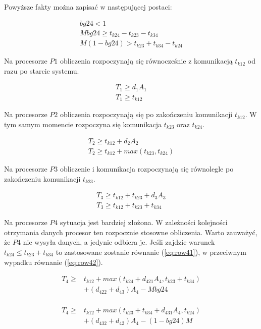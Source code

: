 Powyższe fakty można zapisać w następującej postaci:

\begin{equation}
\begin{array}{l}
bg24 < 1 \\
Mbg24 \geq t_{k24} - t_{k23} - t_{k34} \\
M(1 - bg24) > t_{k23} + t_{k34} - t_{k24}
\end{array}
\end{equation}

Na procesorze $P1$ obliczenia rozpoczynają się równocześnie z komunikacją $t_{k12}$ od razu po starcie systemu.

\begin{equation}
\begin{array}{l}
T_{1} \geq d_{1}A_{1} \\
T_{1} \geq t_{k12}
\end{array}
\end{equation}

Na procesorze $P2$ obliczenia rozpoczynają się po zakończeniu komunikacji $t_{k12}$.
W tym samym momencie rozpoczyna się komunikacja $t_{k23}$ oraz $t_{k24}$.

\begin{equation}
\begin{array}{l}
T_{2} \geq t_{k12} + d_{2}A_{2} \\
T_{2} \geq t_{k12} + max(t_{k23}, t_{k24})
\end{array}
\end{equation}

Na procesorze $P3$ obliczenie i komunikacja rozpoczynają się równolegle po zakończeniu komunikacji $t_{k23}$.

\begin{equation}
\begin{array}{l}
T_{3} \geq t_{k12} + t_{k23} + d_{3}A_{3} \\
T_{3} \geq t_{k12} + t_{k23} + t_{k34}
\end{array}
\end{equation}

Na procesorze $P4$ sytuacja jest bardziej złożona. W zależności kolejności otrzymania danych procesor ten rozpocznie stosowne obliczenia.
Warto zauważyć, że $P4$ nie wysyła danych, a jedynie odbiera je.
Jeśli zajdzie warunek $t_{k24} \leq t_{k23} + t_{k34}$ to zastosowane zostanie równanie (\ref{eq:row41}), w przeciwnym wypadku równanie (\ref{eq:row42}).

\begin{equation} \label{eq:row41}
\begin{array}{rl}
T_{4} \geq &t_{k12} + max(t_{k24} + d_{421}A_{4}, t_{k23} + t_{k34}) \\
&+ (d_{422} + d_{43})A_{4} - Mbg24 \\
\end{array}
\end{equation}

\begin{equation} \label{eq:row42}
\begin{array}{rl}
T_{4} \geq &t_{k12} + max(t_{k23} + t_{k34} + d_{431}A_{4}, t_{k24}) \\
&+ (d_{432} + d_{42})A_{4} - (1-bg24)M
\end{array}
\end{equation}
